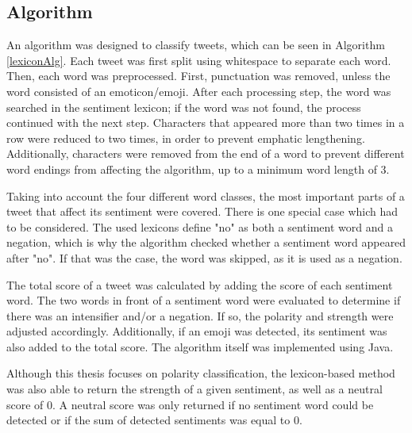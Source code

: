 \subsection{Algorithm}

An algorithm was designed to classify tweets, which can be seen in Algorithm \ref{lexiconAlg}. Each tweet was first split using whitespace to separate each word. Then, each word was preprocessed. First, punctuation was removed, unless the word consisted of an emoticon/emoji. After each processing step, the word was searched in the sentiment lexicon; if the word was not found, the process continued with the next step. Characters that appeared more than two times in a row were reduced to two times, in order to prevent emphatic lengthening. Additionally, characters were removed from the end of a word to prevent different word endings from affecting the algorithm, up to a minimum word length of 3.

Taking into account the four different word classes, the most important parts of a tweet that affect its sentiment were covered. There is one special case which had to be considered. The used lexicons define "no" as both a sentiment word and a negation, which is why the algorithm checked whether a sentiment word appeared after "no". If that was the case, the word was skipped, as it is used as a negation.

The total score of a tweet was calculated by adding the score of each sentiment word. The two words in front of a sentiment word were evaluated to determine if there was an intensifier and/or a negation. If so, the polarity and strength were adjusted accordingly. Additionally, if an emoji was detected, its sentiment was also added to the total score. The algorithm itself was implemented using Java.

Although this thesis focuses on polarity classification, the lexicon-based method was also able to return the strength of a given sentiment, as well as a neutral score of 0. A neutral score was only returned if no sentiment word could be detected or if the sum of detected sentiments was equal to 0.

